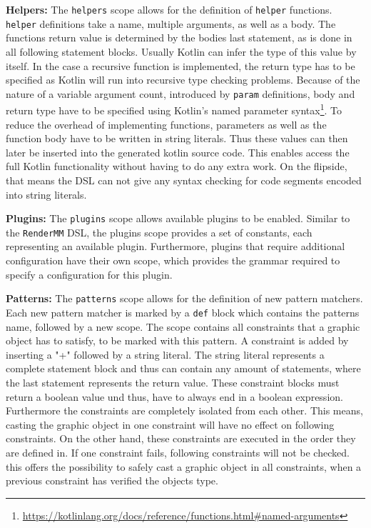 \textbf{Helpers:} The \texttt{helpers} scope allows for the definition of \texttt{helper} functions. \texttt{helper} definitions take a name, multiple arguments, as well as a body. The functions return value is determined by the bodies last statement, as is done in all following statement blocks. Usually Kotlin can infer the type of this value by itself. In the case a recursive function is implemented, the return type has to be specified as Kotlin will run into recursive type checking problems. Because of the nature of a variable argument count, introduced by \texttt{param} definitions, body and return type have to be specified using Kotlin's named parameter syntax\footnote{\url{https://kotlinlang.org/docs/reference/functions.html\#named-arguments}}. To reduce the overhead of implementing functions, parameters as well as the function body have to be written in string literals. Thus these values can then later be inserted into the generated kotlin source code. This enables access the full Kotlin functionality without having to do any extra work. On the flipside, that means the DSL can not give any syntax checking for code segments encoded into string literals.

\textbf{Plugins:} The \texttt{plugins} scope allows available plugins to be enabled. Similar to the \texttt{RenderMM} DSL, the plugins scope provides a set of constants, each representing an available plugin. Furthermore, plugins that require additional configuration have their own scope, which provides the grammar required to specify a configuration for this plugin.

\textbf{Patterns:} The \texttt{patterns} scope allows for the definition of new pattern matchers. Each new pattern matcher is marked by a \texttt{def} block which contains the patterns name, followed by a new scope. The scope contains all constraints that a graphic object has to satisfy, to be marked with this pattern. A constraint is added by inserting a "+" followed by a string literal. The string literal represents a complete statement block and thus can contain any amount of statements, where the last statement represents the return value. These constraint blocks must return a boolean value und thus, have to always end in a boolean expression. Furthermore the constraints are completely isolated from each other. This means, casting the graphic object in one constraint will have no effect on following constraints. On the other hand, these constraints are executed in the order they are defined in. If one constraint fails, following constraints will not be checked. this offers the possibility to safely cast a graphic object in all constraints, when a previous constraint has verified the objects type.

